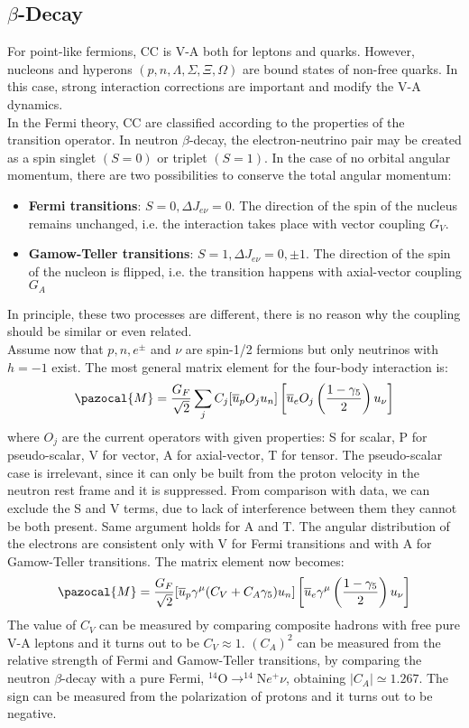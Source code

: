\documentclass[10.75pt,a4paper,openright,bottom=2cm]{article}
\begin{document}
\subsection{$\beta$-Decay}
For point-like fermions, CC is V-A both for leptons and quarks. However, nucleons and hyperons $(p, n, \Lambda, \Sigma, \Xi, \Omega)$ are bound states of non-free quarks. In this case, strong interaction corrections are important and modify the V-A dynamics.\\
In the Fermi theory, CC are classified according to the properties of the transition operator. In neutron $\beta$-decay, the electron-neutrino pair may be created as a spin singlet $(S=0)$ or triplet $(S=1)$. In the case of no orbital angular momentum, there are two possibilities to conserve the total angular momentum:
\begin{itemize}
    \item \textbf{Fermi transitions}: $S=0, \Delta J_{e\nu}=0$. The direction of the spin of the nucleus remains unchanged, i.e. the interaction takes place with vector coupling $G_V$.
    \item \textbf{Gamow-Teller transitions}: $S=1, \Delta J_{e\nu}=0,\pm1$. The direction of the spin of the nucleon is flipped, i.e. the transition happens with axial-vector coupling $G_A$
\end{itemize}
In principle, these two processes are different, there is no reason why the coupling should be similar or even related.\\
Assume now that $p,n, e^\pm$ and $\nu$ are spin-1/2 fermions but only neutrinos with $h=-1$ exist. The most general matrix element for the four-body interaction is:
\[
\pazocal{M}=\frac{G_F}{\sqrt{2}}\sum_j C_j[\overline{u}_pO_ju_n]\left[\overline{u}_eO_j\left(\frac{1-\gamma_5}{2}\right)u_\nu\right]
\]
where $O_j$ are the current operators with given properties: S for scalar, P for pseudo-scalar, V for vector, A for axial-vector, T for tensor. The pseudo-scalar case is irrelevant, since it can only be built from the proton velocity in the neutron rest frame and it is suppressed. From comparison with data, we can exclude the S and V terms, due to lack of interference between them they cannot be both present. Same argument holds for A and T. The angular distribution of the electrons are consistent only with V for Fermi transitions and with A for Gamow-Teller transitions. The matrix element now becomes:
\[
\pazocal{M}=\frac{G_F}{\sqrt{2}}[\overline{u}_p\gamma^\mu(C_V+C_A\gamma_5)u_n]\left[\overline{u}_e\gamma^\mu\left(\frac{1-\gamma_5}{2}\right)u_\nu\right]
\]
The value of $C_V$ can be measured by comparing composite hadrons with free pure V-A leptons and it turns out to be $C_V\approx1$. $(C_A)^2$ can be measured from the relative strength of Fermi and Gamow-Teller transitions, by comparing the neutron $\beta$-decay with a pure Fermi, $^{14}$O$\to^{14}$N$e^+\nu$, obtaining $|C_A|\simeq1.267$. The sign can be measured from the polarization of protons and it turns out to be negative.
\end{document}
